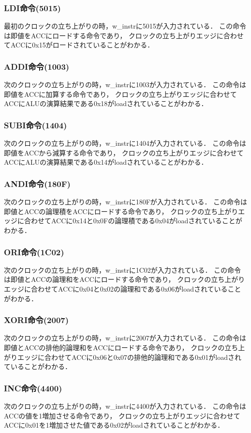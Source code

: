 \documentclass[a4paper,11pt]{ltjsarticle}
\begin{document}
\subsubsection{LDI命令(5015)}
最初のクロックの立ち上がりの時，w\_instrに5015が入力されている．
この命令は即値をACCにロードする命令であり，
クロックの立ち上がりエッジに合わせてACCに0x15がロードされていることがわかる．
\subsubsection{ADDI命令(1003)}
次のクロックの立ち上がりの時，w\_instrに1003が入力されている．
この命令は即値をACCに加算する命令であり，
クロックの立ち上がりエッジに合わせてACCにALUの演算結果である0x18がloadされていることがわかる．
\subsubsection{SUBI命令(1404)}
次のクロックの立ち上がりの時，w\_instrに1404が入力されている．
この命令は即値をACCから減算する命令であり，
クロックの立ち上がりエッジに合わせてACCにALUの演算結果である0x14がloadされていることがわかる．
\subsubsection{ANDI命令(180F)}
次のクロックの立ち上がりの時，w\_instrに180Fが入力されている．
この命令は即値とACCの論理積をACCにロードする命令であり，
クロックの立ち上がりエッジに合わせてACCに0x14と0x0Fの論理積である0x04がloadされていることがわかる．
\subsubsection{ORI命令(1C02)}
次のクロックの立ち上がりの時，w\_instrに1C02が入力されている．
この命令は即値とACCの論理和をACCにロードする命令であり，
クロックの立ち上がりエッジに合わせてACCに0x04と0x02の論理和である0x06がloadされていることがわかる．
\subsubsection{XORI命令(2007)}
次のクロックの立ち上がりの時，w\_instrに2007が入力されている．
この命令は即値とACCの排他的論理和をACCにロードする命令であり，
クロックの立ち上がりエッジに合わせてACCに0x06と0x07の排他的論理和である0x01がloadされていることがわかる．
\subsubsection{INC命令(4400)}
次のクロックの立ち上がりの時，w\_instrに4400が入力されている．
この命令はACCの値を1増加させる命令であり，
クロックの立ち上がりエッジに合わせてACCに0x01を1増加させた値である0x02がloadされていることがわかる．
\end{document}
